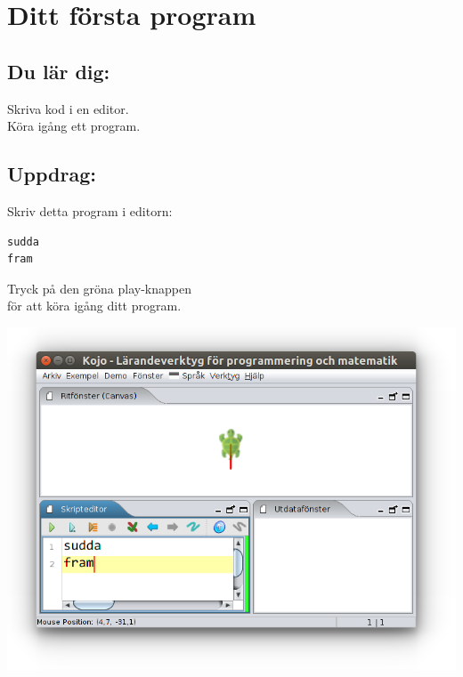 \chapter{Ditt första program}
\begin{multicols}{2}
\section*{\color{MidnightBlue}Du lär dig:}
Skriva kod i en editor.\\
Köra igång ett program.
\section*{\color{MidnightBlue}Uppdrag:}
Skriv detta program i editorn:

\begin{lstlisting}[basicstyle={\ttfamily\fontsize{24}{24}\selectfont}]
sudda
fram
\end{lstlisting}
        
Tryck på den gröna play-knappen\\
för att köra igång ditt program.

\columnbreak

\includegraphics[width=14cm]{../img/fram.png}
\end{multicols}


